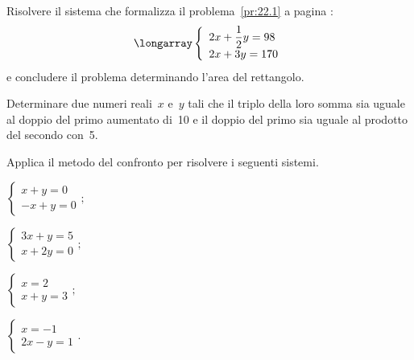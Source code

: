 \begin{esercizio}
 \label{ese:22.14}
 Risolvere il sistema che formalizza il problema~\ref{pr:22.1} a pagina \pageref{pr:22.1}:
\[\longarray\left\{\begin{array}{l}2x+\dfrac{1}{2}y=98
\\2x+3y=170 \end{array}\right.\]
e concludere il problema determinando l'area del rettangolo.
\end{esercizio}

\begin{esercizio}
 \label{ese:22.15}
Determinare due numeri reali~$x$ e~$y$ tali che il
triplo della loro somma sia uguale al doppio del primo aumentato di~10
e il doppio del primo sia uguale al prodotto del secondo con~5.
 \end{esercizio}

\begin{esercizio}[\Ast]
 \label{ese:22.16}
Applica il metodo del confronto per risolvere i seguenti sistemi.
 \begin{multicols}{2}
 \begin{enumeratea}
 \item $\left\{\begin{array}{l}x+y=0\\-x+y=0\end{array}\right.;$
\item $\left\{\begin{array}{l}3x+y=5\\x+2y=0\end{array}\right.;$
\item $\left\{\begin{array}{l}x=2\\x+y=3\end{array}\right.;$
\item $\left\{\begin{array}{l}x=-1\\2x-y=1\end{array}\right..$
 \end{enumeratea}
 \end{multicols}
\end{esercizio}

